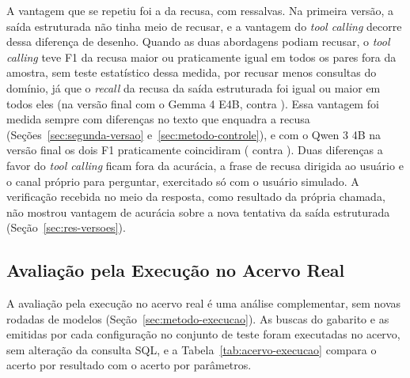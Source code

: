 A vantagem que se repetiu foi a da recusa, com ressalvas. Na primeira versão, a saída estruturada não tinha meio de recusar, e a vantagem do \textit{tool calling} decorre dessa diferença de desenho. Quando as duas abordagens podiam recusar, o \textit{tool calling} teve F1 da recusa maior ou praticamente igual em todos os pares fora da amostra, sem teste estatístico dessa medida, por recusar menos consultas do domínio, já que o \textit{recall} da recusa da saída estruturada foi igual ou maior em todos eles (na versão final com o Gemma 4 E4B,  contra ). Essa vantagem foi medida sempre com diferenças no texto que enquadra a recusa (Seções~\ref{sec:segunda-versao} e~\ref{sec:metodo-controle}), e com o Qwen 3 4B na versão final os dois F1 praticamente coincidiram ( contra ). Duas diferenças a favor do \textit{tool calling} ficam fora da acurácia, a frase de recusa dirigida ao usuário e o canal próprio para perguntar, exercitado só com o usuário simulado. A verificação recebida no meio da resposta, como resultado da própria chamada, não mostrou vantagem de acurácia sobre a nova tentativa da saída estruturada (Seção~\ref{sec:res-versoes}).

\subsection{Avaliação pela Execução no Acervo Real}
\label{sec:res-acervo}

A avaliação pela execução no acervo real é uma análise complementar, sem novas rodadas de modelos (Seção~\ref{sec:metodo-execucao}). As buscas do gabarito e as emitidas por cada configuração no conjunto de teste foram executadas no acervo, sem alteração da consulta SQL, e a Tabela~\ref{tab:acervo-execucao} compara o acerto por resultado com o acerto por parâmetros.

